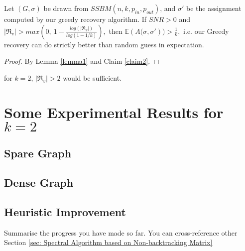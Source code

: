 \begin{corollary}
    Let $(G, \sigma)$ be drawn from $SSBM(n, k, p_{in}, p_{out})$, and $\sigma'$ be the assignment computed by our greedy recovery algorithm. If $SNR>0$ and$|\Re_v|>max(0,~1-\frac{log(|\Re_v|)}{log(1-1/k)}),$ then $\mathbb{E}({A(\sigma, \sigma'}))>\frac{1}{k},$ i.e. our Greedy recovery can do strictly better than random guess in expectation.
\end{corollary}
\begin{proof}
    By Lemma \ref{lemma1} and Claim \ref{claim2}.
\end{proof}
\begin{remark}
    for $k=2$, $|\Re_v|>2$ would be sufficient.
\end{remark}
\section{Some Experimental Results for $k=2$}
\subsection{Spare Graph}
\subsection{Dense Graph}
\subsection{Heuristic Improvement}
Summarise the progress you have made so far. You can cross-reference other 
Section \ref{sec: Spectral Algorithm based on Non-backtracking Matrix}